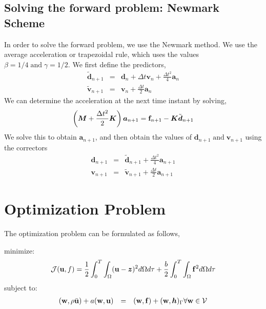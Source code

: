\documentclass[10pt]{article}
\newcommand{\tmmathbf}[1]{\ensuremath{\boldsymbol{#1}}}
\newcommand{\tmop}[1]{\ensuremath{\operatorname{#1}}}
\begin{document}
\subsection{Solving the forward problem: Newmark Scheme}

In order to solve the forward problem, we use the Newmark method. We use the
average acceleration or trapezoidal rule, which uses the values $\beta = 1 / 4
\tmop{and} \gamma = 1 / 2$. We first define the predictors,
\begin{eqnarray}
  \tilde{\tmmathbf{d}}_{n + 1} & = & \tmmathbf{d}_n + \Delta t\tmmathbf{v}_n +
  \frac{\Delta t^2}{4} \tmmathbf{a}_n \nonumber\\
  \tilde{\tmmathbf{v}}_{n + 1} & = & \tmmathbf{v}_n + \frac{\Delta t}{2}
  \tmmathbf{a}_n 
\end{eqnarray}
We can determine the acceleration at the next time instant by solving,
\begin{equation}
  \left( \tmmathbf{M}+ \frac{\Delta t^2}{2} \tmmathbf{K} \right)
  \tmmathbf{a}_{n + 1} =\force_{n + 1} -\tmmathbf{K}
  \tilde{\tmmathbf{d}}_{n + 1}
\end{equation}
We solve this to obtain $\tmmathbf{a}_{n + 1}$, and then obtain the values of
$\tmmathbf{d}_{n + 1} \tmop{and} \tmmathbf{v}_{n + 1}$ using the correctors
\begin{eqnarray}
  \tmmathbf{d}_{n + 1} & = & \tilde{\tmmathbf{d}}_{n + 1} + \frac{\Delta
  t^2}{4} \tmmathbf{a}_{n + 1} \nonumber\\
  \tmmathbf{v}_{n + 1} & = & \tilde{\tmmathbf{v}}_{n + 1} + \frac{\Delta t}{2}
  \tmmathbf{a}_{n + 1} 
\end{eqnarray}

\section{Optimization Problem}

The optimization problem can be formulated as follows,

minimize:
\[ \mathcal{J}(\bu, f ) = \frac{1}{2} \int^T_0
   \int_{\Omega} (\bu-\tmmathbf{z})^2 d \Omega d \tau +
   \frac{b}{2} \int^T_0 \int_{\Omega} \force^2 d \Omega d
   \tau \]
subject to:
\[ \begin{array}{lll}
     (\bw, \rho \ddot{\bu} ) + a (\bw,\bu)
     & = & (\bw,\force) + (\bw,\tmmathbf{h})_{\Gamma}
     \forall \bw \in \mathcal{V}
   \end{array} \]
\end{document}
